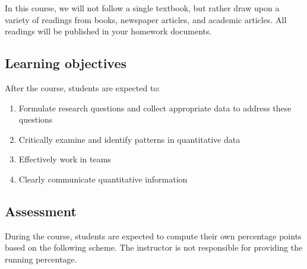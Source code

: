 \documentclass[
]{article}
\begin{document}
In this course, we will not follow a single textbook, but rather draw upon a variety of readings from books, newspaper articles, and academic articles. All readings will be published in your homework documents.

\hypertarget{learning-objectives}{%
\subsection*{Learning objectives}\label{learning-objectives}}

After the course, students are expected to:

\begin{enumerate}
\def\labelenumi{\arabic{enumi}.}
\item
  Formulate research questions and collect appropriate data to address these questions
\item
  Critically examine and identify patterns in quantitative data
\item
  Effectively work in teams
\item
  Clearly communicate quantitative information
\end{enumerate}

\hypertarget{assessment}{%
\subsection*{Assessment}\label{assessment}}

During the course, students are expected to compute their own percentage
points based on the following scheme.
The instructor is not responsible for providing the running percentage.
\end{document}
